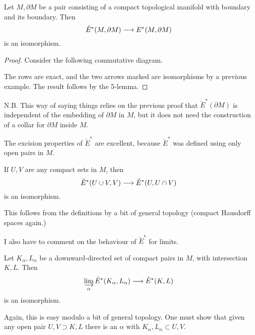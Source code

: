 \documentclass[../main]{subfiles}
\begin{document}
\begin{examples}
Let $M, \partial M$ be a pair consisting of a compact topological manifold with boundary and its boundary. Then 
\[\check{E}^*(M,\partial M) \longrightarrow E^*(M,\partial M)\]
is an isomorphism.
\end{examples}
\begin{proof}
Consider the following commutative diagram.

The rows are exact, and the two arrows marked are isomorphisms by a previous example. The result follows by the 5-lemma.
\end{proof}

N.B. This way of saying things relies on the previous proof that $\check{E}^*(\partial M)$ is independent of the embedding of $\partial M$ in $M$, but it does not need the construction of a collar for $\partial M$ inside $M$.

The excision properties of $\check{E}^*$ are excellent, because $\check{E}^*$ was defined using only open pairs in $M$.
\begin{proposition}\label{prop:p3c10.4}
If $U,V$ are any compact sets in $M$, then
\[\check{E}^*(U \cup V,V) \longrightarrow \check{E}^*(U,U \cap V)\]
is an isomorphism.
\end{proposition}

This follows from the definitions by a bit of general topology (compact Hausdorff spaces again.)

I also have to comment on the behaviour of $\check{E}^*$ for limits.
\begin{proposition}\label{prop:p3c10.5}
Let $K_\alpha,L_\alpha$ be a downward-directed set of compact pairs in $M$, with intersection $K,L$. Then 
\[\varinjlim_{\alpha} \check{E}^*(K_\alpha,L_\alpha) \longrightarrow \check{E}^*(K,L)\]
is an isomorphism.
\end{proposition}
Again, this is easy modulo a bit of general topology. One must show that given any open pair $U,V \supset K,L$ there is an $\alpha$ with $K_\alpha,L_\alpha \subset U,V$.
\end{document}
